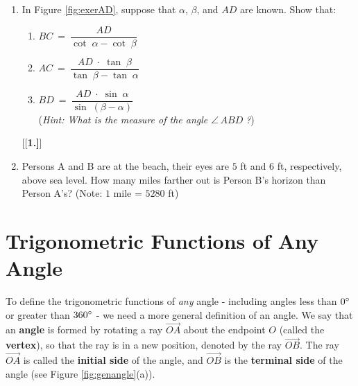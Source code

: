 {\begin{enumerate}[\bfseries 1.]
\begin{enumerate}[\bfseries (a)]
   \item Find the angle $\theta$ that $\overline{AB}$ makes with the base of the cube.\vspace{5mm}
  \end{enumerate}
[{[\bfseries 1.]}]
\piccaption[]{\label{fig:exerAD}}
 \item In Figure \ref{fig:exerAD}, suppose that $\alpha$, $\beta$, and $AD$ are known. Show that:
  \begin{enumerate}[\bfseries (a)]
   \item $BC ~=~ \dfrac{AD}{\cot\;\alpha - \cot\;\beta}$\vspace{3mm}
   \item $AC ~=~ \dfrac{AD\;\cdot\;\tan\;\beta}{\tan\;\beta - \tan\;\alpha}$\vspace{3mm}
   \item $BD ~=~ \dfrac{AD\;\cdot\;\sin\;\alpha}{\sin\;(\beta - \alpha)}$\vspace{2mm}\\(\emph{Hint:
   What is the measure of the angle $\angle\,ABD\;$?})\vspace{2mm}
  \end{enumerate}
[{[\bfseries 1.]}]
 \item Persons A and B are at the beach, their eyes are $5$ ft and $6$ ft, respectively, above sea
  level. How many miles farther out is Person B's horizon than Person A's? (Note: $1$ mile = $5280$
  ft)
\end{enumerate}
}
\newpage
\section{Trigonometric Functions of Any Angle}
To define the trigonometric functions of \emph{any} angle - including angles less than $0^\circ$
or greater than $360^\circ$ - we need a more general
definition of an angle. We say that an \textbf{angle} is formed by
rotating a ray $\overrightarrow{OA}$ about the endpoint $O$ (called the
\textbf{vertex}), so that the ray is in a new position,
denoted by the ray $\overrightarrow{OB}$. The ray $\overrightarrow{OA}$ is called the
\textbf{initial side} of the angle, and
$\overrightarrow{OB}$ is the
\textbf{terminal side} of the angle
(see Figure \ref{fig:genangle}(a)).\vspace{-2mm}

